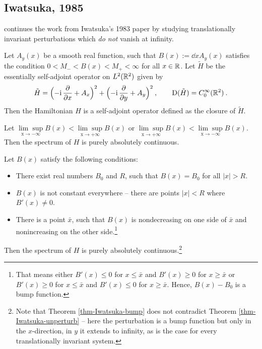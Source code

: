\subsection{Iwatsuka, 1985}
\cite{Iwatsuka1985} continues the work from Iwatsuka's 1983 paper by studying translationally invariant perturbations which \textit{do not} vanish at infinity.
\begin{defn}[Hamiltonian]
    Let $A_y(x)$ be a smooth real function, such that $B(x) := \dd{}{x} A_y(x)$ satisfies the condition $0 < M_- < B(x) < M_+ < \infty$ for all $x \in \mathbb{R}$. Let $\tilde H$ be the essentially self-adjoint operator on $L^2(\mathbb{R}^2)$ given by
    \begin{gather*}
        \tilde H
        = \Big( {-\mathrm{i}} \, \frac{\partial }{\partial x} + A_x \Big)^2
        + \Big( {-\mathrm{i}} \, \frac{\partial }{\partial y} + A_y \Big)^2
        \: , \qquad
        \mathrm{D}(\tilde H) = C_0^\infty(\mathbb{R}^2)
        \: .
    \end{gather*}
    Then the Hamiltonian $H$ is a self-adjoint operator defined as the closure of $\tilde H$.
\end{defn}
\begin{thm}
    Let $\operatorname{\underset{x \to -\infty}{\lim\sup}} B(x) < \operatorname{\underset{x \to +\infty}{\lim\sup}} B(x)$ or $\operatorname{\underset{x \to +\infty}{\lim\sup}} B(x) < \operatorname{\underset{x \to -\infty}{\lim\sup}} B(x)$. Then the spectrum of $H$ is purely absolutely continuous.
\end{thm}
\begin{thm} \label{thm-Iwatsuka-bump}
    Let $B(x)$ satisfy the following conditions:
    \begin{itemize}
        \item There exist real numbers $B_0$ and $R$, such that $B(x) = B_0$ for all $|x| > R$.
        \item $B(x)$ is not constant everywhere – there are points $|x| \!<\! R$ where $B'(x) \!\neq\! 0$.
        \item There is a point $\bar x$, such that $B(x)$ is nondecreasing on one side of $\bar x$ and nonincreasing on the other side.\footnote{That means either $B'(x)\leq 0$ for $x\leq\bar x$ and $B'(x) \geq 0$ for $x\geq\bar x$ or $B'(x)\geq 0$ for $x\leq\bar x$ and $B'(x) \leq 0$ for $x\geq\bar x$. Hence, $B(x) - B_0$ is a bump function.}
    \end{itemize}
    Then the spectrum of $H$ is purely absolutely continuous.\footnote{Note that Theorem \ref{thm-Iwatsuka-bump} does not contradict Theorem \ref{thm-Iwatsuka-unperturb} – here the perturbation is a bump function but only in the $x$-direction, in $y$ it extends to infinity, as is the case for every translationally invariant system.}
\end{thm}

